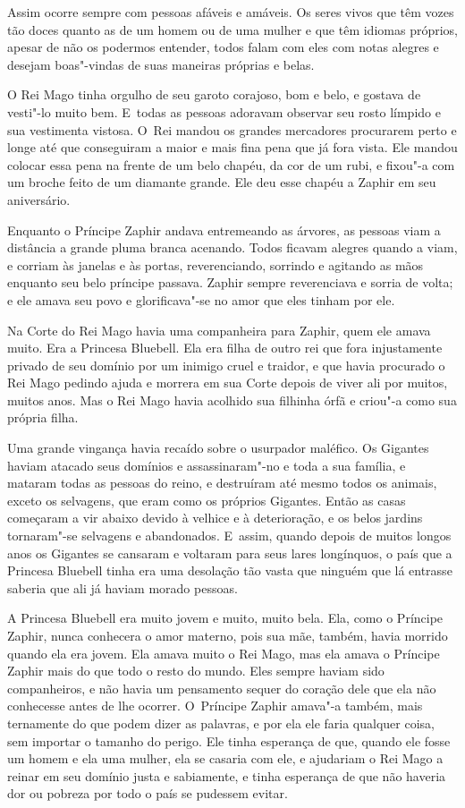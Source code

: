 Assim ocorre sempre com pessoas afáveis e amáveis. Os seres vivos que
têm vozes tão doces quanto as de um homem ou de uma mulher e que têm
idiomas próprios, apesar de não os podermos entender, todos falam com
eles com notas alegres e desejam boas"-vindas de suas maneiras próprias e
belas.

O Rei Mago tinha orgulho de seu garoto corajoso, bom e belo, e gostava
de vesti"-lo muito bem. E~todas as pessoas adoravam observar seu rosto
límpido e sua vestimenta vistosa. O~Rei mandou os grandes mercadores
procurarem perto e longe até que conseguiram a maior e mais fina pena
que já fora vista. Ele mandou colocar essa pena na frente de um belo
chapéu, da cor de um rubi, e fixou"-a com um broche feito de um diamante
grande. Ele deu esse chapéu a Zaphir em seu aniversário.

Enquanto o Príncipe Zaphir andava entremeando as árvores, as pessoas
viam a distância a grande pluma branca acenando. Todos ficavam alegres
quando a viam, e corriam às janelas e às portas, reverenciando, sorrindo
e agitando as mãos enquanto seu belo príncipe passava. Zaphir sempre
reverenciava e sorria de volta; e ele amava seu povo e glorificava"-se no
amor que eles tinham por ele.

Na Corte do Rei Mago havia uma companheira para Zaphir, quem ele amava
muito. Era a Princesa Bluebell. Ela era filha de outro rei que fora
injustamente privado de seu domínio por um inimigo cruel e traidor, e que
havia procurado o Rei Mago pedindo ajuda e morrera em sua Corte depois
de viver ali por muitos, muitos anos. Mas o Rei Mago havia acolhido sua
filhinha órfã e criou"-a como sua própria filha.

Uma grande vingança havia recaído sobre o usurpador maléfico. Os
Gigantes haviam atacado seus domínios e assassinaram"-no e toda a sua
família, e mataram todas as pessoas do reino, e destruíram até mesmo
todos os animais, exceto os selvagens, que eram como os próprios
Gigantes. Então as casas começaram a vir abaixo devido à velhice e à
deterioração, e os belos jardins tornaram"-se selvagens e abandonados. E~assim, quando depois de muitos longos anos os Gigantes se cansaram e
voltaram para seus lares longínquos, o país que a Princesa Bluebell
tinha era uma desolação tão vasta que ninguém que lá entrasse saberia
que ali já haviam morado pessoas.

A Princesa Bluebell era muito jovem e muito, muito bela. Ela, como o
Príncipe Zaphir, nunca conhecera o amor materno, pois sua mãe, também,
havia morrido quando ela era jovem. Ela amava muito o Rei Mago, mas ela
amava o Príncipe Zaphir mais do que todo o resto do mundo. Eles sempre
haviam sido companheiros, e não havia um pensamento sequer do coração
dele que ela não conhecesse antes de lhe ocorrer. O~Príncipe Zaphir
amava"-a também, mais ternamente do que podem dizer as palavras, e por
ela ele faria qualquer coisa, sem importar o tamanho do perigo. Ele
tinha esperança de que, quando ele fosse um homem e ela uma mulher, ela
se casaria com ele, e ajudariam o Rei Mago a reinar em seu domínio justa
e sabiamente, e tinha esperança de que não haveria dor ou pobreza por
todo o país se pudessem evitar.

